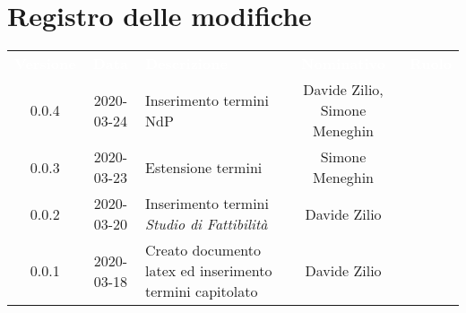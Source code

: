 
\section{Registro delle modifiche}
{
	\renewcommand{\arraystretch}{1.5}
	\centering
	\begin{longtable}{ c c  C{4cm}  c  c }
		
		\textcolor{white}{\textbf{Versione}} & \textcolor{white}{\textbf{Data}} & \textcolor{white}{\textbf{Descrizione}} & \textcolor{white}{\textbf{Nominativo}} & \textcolor{white}{\textbf{Ruolo}}\\
		0.0.4 & 2020-03-24 & Inserimento termini NdP & Davide Zilio, Simone Meneghin &\reda{}\\
		
		0.0.3 & 2020-03-23 & Estensione termini & Simone Meneghin & \reda{}\\
		
		0.0.2 & 2020-03-20 & Inserimento termini \textit{Studio di Fattibilità}& Davide Zilio &\reda{}\\
		
		0.0.1 & 2020-03-18 & Creato documento latex ed inserimento termini capitolato & Davide Zilio &\reda{}\\		
		
	\end{longtable}

}